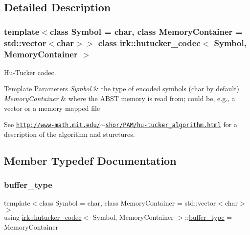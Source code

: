 \subsection{Detailed Description}
\subsubsection*{template$<$class Symbol = char, class Memory\+Container = std\+::vector$<$char$>$$>$\newline
class irk\+::hutucker\+\_\+codec$<$ Symbol, Memory\+Container $>$}

Hu-\/\+Tucker codec. 


\begin{DoxyTemplParams}{Template Parameters}
{\em Symbol} & the type of encoded symbols ({\ttfamily char} by default) \\
\hline
{\em Memory\+Container} & where the A\+B\+ST memory is read from; could be, e.\+g., a vector or a memory mapped file\\
\hline
\end{DoxyTemplParams}
See \href{http://www-math.mit.edu/~shor/PAM/hu-tucker_algorithm.html}{\tt http\+://www-\/math.\+mit.\+edu/$\sim$shor/\+P\+A\+M/hu-\/tucker\+\_\+algorithm.\+html} for a description of the algorithm and sturctures. 

\subsection{Member Typedef Documentation}
\mbox{\label{classirk_1_1hutucker__codec_a995378c8c253dae9867a4b1762eeaf95}} 
\subsubsection{\texorpdfstring{buffer\+\_\+type}{buffer\_type}}
{\footnotesize\ttfamily template$<$class Symbol  = char, class Memory\+Container  = std\+::vector$<$char$>$$>$ \\
using \mbox{\hyperlink{classirk_1_1hutucker__codec}{irk\+::hutucker\+\_\+codec}}$<$ Symbol, Memory\+Container $>$\+::\mbox{\hyperlink{classirk_1_1hutucker__codec_a995378c8c253dae9867a4b1762eeaf95}{buffer\+\_\+type}} =  Memory\+Container}

\mbox{\label{classirk_1_1hutucker__codec_af23dee5959ae2a69eea0ab324cf6ecb6}} 
